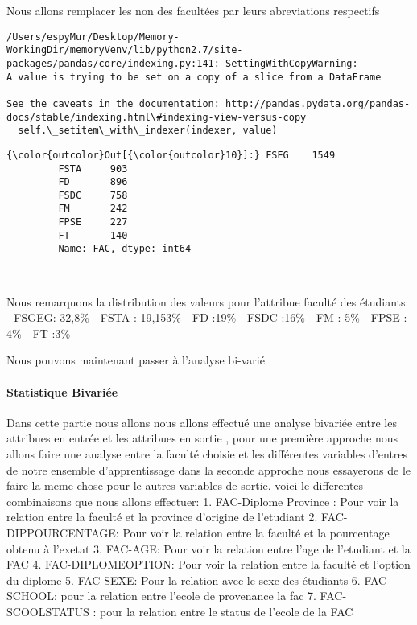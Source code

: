 \documentclass[11pt]{article}
\begin{document}
    Nous allons remplacer les non des facultées par leurs abreviations
respectifs

    \begin{Verbatim}[commandchars=\\\{\}]
/Users/espyMur/Desktop/Memory-WorkingDir/memoryVenv/lib/python2.7/site-packages/pandas/core/indexing.py:141: SettingWithCopyWarning: 
A value is trying to be set on a copy of a slice from a DataFrame

See the caveats in the documentation: http://pandas.pydata.org/pandas-docs/stable/indexing.html\#indexing-view-versus-copy
  self.\_setitem\_with\_indexer(indexer, value)

    \end{Verbatim}

            \begin{Verbatim}[commandchars=\\\{\}]
{\color{outcolor}Out[{\color{outcolor}10}]:} FSEG    1549
         FSTA     903
         FD       896
         FSDC     758
         FM       242
         FPSE     227
         FT       140
         Name: FAC, dtype: int64
\end{Verbatim}
        
    \begin{center}
    \end{center}
    { \hspace*{\fill} \\}
    
     Nous remarquons la distribution des valeurs pour
l'attribue faculté des étudiants: - FSGEG: 32,8\% - FSTA : 19,153\% - FD
:19\% - FSDC :16\% - FM : 5\% - FPSE : 4\% - FT :3\%

    Nous pouvons maintenant passer à l'analyse bi-varié

    \paragraph{Statistique Bivariée}\label{statistique-bivariuxe9e}

    Dans cette partie nous allons nous allons effectué une analyse bivariée
entre les attribues en entrée et les attribues en sortie , pour une
première approche nous allons faire une analyse entre la faculté choisie
et les différentes variables d'entres de notre ensemble d'apprentissage
dans la seconde approche nous essayerons de le faire la meme chose pour
le autres variables de sortie. voici le differentes combinaisons que
nous allons effectuer: 1. FAC-Diplome Province : Pour voir la relation
entre la faculté et la province d'origine de l'etudiant 2.
FAC-DIPPOURCENTAGE: Pour voir la relation entre la faculté et la
pourcentage obtenu à l'exetat 3. FAC-AGE: Pour voir la relation entre
l'age de l'etudiant et la FAC 4. FAC-DIPLOMEOPTION: Pour voir la
relation entre la faculté et l'option du diplome 5. FAC-SEXE: Pour la
relation avec le sexe des étudiants 6. FAC-SCHOOL: pour la relation
entre l'ecole de provenance la fac 7. FAC-SCOOLSTATUS : pour la relation
entre le status de l'ecole de la FAC
\end{document}
